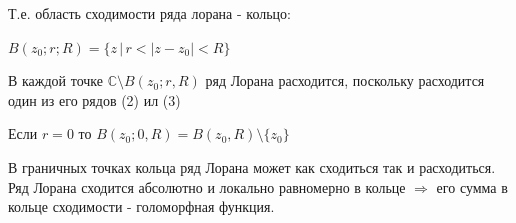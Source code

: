 \documentclass[a4paper, 12pt]{report}
\begin{document}
\par\bigskip
Т.е. область сходимости ряда лорана - кольцо:
\par\bigskip
\begin{center}
$B(z_0; r; R) = \{z \, | \,  r < |z - z_0| < R\}$
\end{center}
\par\bigskip
В каждой точке $\mathbb{C} \setminus B(z_0; r, R)$ ряд Лорана расходится, поскольку расходится один из его рядов (2) ил (3)
\par
Если $r = 0$ то $B(z_0; 0, R) = B(z_0, R) \setminus \{z_0\}$
\par
В граничных точках кольца ряд Лорана может как сходиться так и расходиться. Ряд Лорана сходится абсолютно и локально равномерно в кольце $\Rightarrow$ его сумма в кольце сходимости - голоморфная функция.
\end{document}
